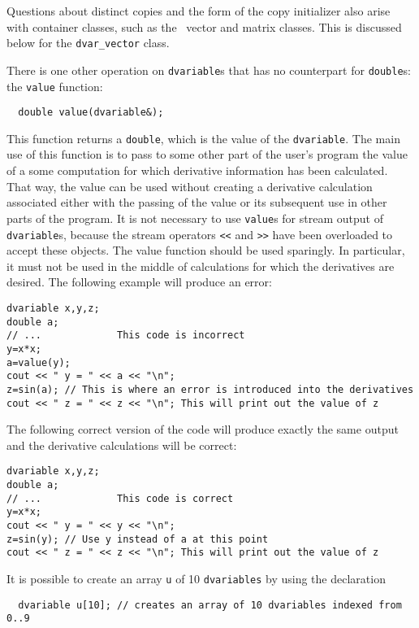 \documentclass{admbmanual}
\begin{document}
Questions about distinct copies and the form of the copy initializer 
also arise with container classes, such as the
\scAD\ vector and matrix classes. This is discussed below for the
\texttt{dvar\_vector} class.

There is one other operation on \texttt{dvariable}s that has no counterpart
for \texttt{double}s: the 
\texttt{value} function: 
\begin{lstlisting}
  double value(dvariable&);
\end{lstlisting}
\noindent This function returns a \texttt{double}, which is the value of 
the \texttt{dvariable}. The main use of this function is to pass  to some other part of the user's program
the value of a some computation for which derivative information has been
calculated.  That way, the value
can be used without creating a derivative
calculation associated either with the passing of the value or its subsequent
use in other parts of the program.
It is not necessary to use \texttt{value}s for stream output 
of \texttt{dvariable}s, because the stream operators \texttt{<{}<} and
\texttt{>{}>} have been overloaded to accept these objects. 
The value function should be used sparingly. In particular, it must not 
be used in the middle of calculations for which the derivatives are
desired. The following example will produce an error:
\begin{lstlisting}
dvariable x,y,z;
double a;
// ...             This code is incorrect
y=x*x;
a=value(y);
cout << " y = " << a << "\n";
z=sin(a); // This is where an error is introduced into the derivatives
cout << " z = " << z << "\n"; This will print out the value of z
\end{lstlisting}

The following correct version of the code will produce exactly the same 
output and the derivative calculations will be correct:
\begin{lstlisting}
dvariable x,y,z;
double a;
// ...             This code is correct
y=x*x;
cout << " y = " << y << "\n";
z=sin(y); // Use y instead of a at this point 
cout << " z = " << z << "\n"; This will print out the value of z
\end{lstlisting}

It is possible to create an array \texttt{u} of 10 \texttt{dvariables} by 
using the declaration 
\begin{lstlisting}
  dvariable u[10]; // creates an array of 10 dvariables indexed from 0..9
\end{lstlisting}
\end{document}
